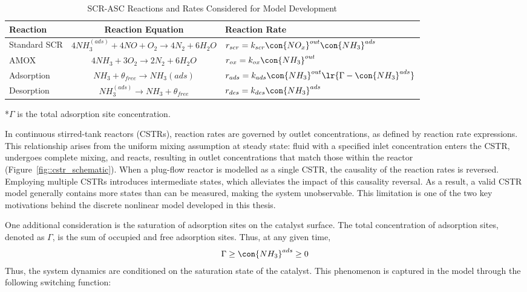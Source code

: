 \begin{table}[!ht]
    \begin{center}
    \caption{SCR-ASC Reactions and Rates Considered for Model Development}
    \label{tab::react_rates}
    \begin{tabular}{|l|c|l|}
        \hline
        Reaction & Reaction Equation & Reaction Rate \\ \hline
        Standard SCR &
        $4 NH_3 ^{(ads)} + 4 NO + O_2 \longrightarrow 4 N_2 + 6 H_2O$ &
        $r_{scr} = k_{scr} \con{NO_x}^{out} \con{NH_3}^{ads}$ \\ \hline
        AMOX &
        $4 NH_3 + 3 O_2 \longrightarrow 2 N_2 + 6 H_2O $ &
        $r_{ox} = k_{ox} \con{NH_3}^{out}$ \\ \hline
        Adsorption&
        $NH_3 + \theta_{free} \longrightarrow NH_3(ads)$ &
        $r_{ads} = k_{ads} \con{NH_3}^{out} \lr{\Gamma - \con{NH_3}^{ads}}$ \\ \hline
        Desorption &
        $NH_3 ^{(ads)} \longrightarrow NH_3 + \theta_{free}$ &
        $r_{des} = k_{des} \con{NH_3}^{ads}$ \\ \hline
    \end{tabular}
    \end{center}
    *$\Gamma$ is the total adsorption site concentration.
\end{table}

In continuous stirred-tank reactors (CSTRs), reaction rates are governed by outlet concentrations, as defined by
reaction rate expressions. This relationship arises from the uniform mixing assumption at steady state: fluid with a
specified inlet concentration enters the CSTR, undergoes complete mixing, and reacts, resulting in outlet concentrations
that match those within the reactor (Figure~\ref{fig::cstr_schematic}). When a plug-flow reactor is modelled as a single
CSTR, the causality of the reaction rates is reversed. Employing multiple CSTRs introduces intermediate states, which
alleviates the impact of this causality reversal. As a result, a valid CSTR model generally contains more states than
can be measured, making the system unobservable. This limitation is one of the two key motivations behind the discrete
nonlinear model developed in this thesis.

One additional consideration is the saturation of adsorption sites on the catalyst surface. The total concentration of adsorption sites, denoted as $\Gamma$, is the sum of occupied and free adsorption sites. Thus, at any given time,
\begin{align}
    \Gamma \geq \con{NH_3}^{ads} \geq 0
\end{align}
Thus, the system dynamics are conditioned on the saturation state of the catalyst. This phenomenon is captured in the model through the following switching function:

